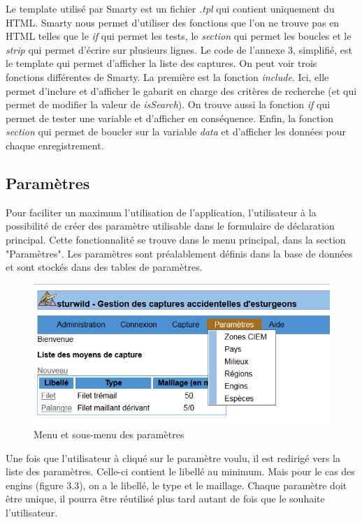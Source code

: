 \documentclass[12pt,a4paper,titlepage,twoside]{report}
\begin{document}
Le template utilisé par Smarty est un fichier \textit{.tpl} qui contient uniquement du HTML. Smarty nous permet d'utiliser des fonctions que l'on ne trouve pas en HTML telles que le \textit{if} qui permet les tests, le \textit{section} qui permet les boucles et le \textit{strip} qui permet d'écrire sur plusieurs lignes. 
Le code de l'annexe 3, simplifié, est le template qui permet d'afficher la liste des captures. On peut voir trois fonctions différentes de Smarty. La première est la fonction \textit{include}. Ici, elle permet d'inclure et d'afficher le gabarit en charge des critères de recherche (et qui permet de modifier la valeur de \textit{isSearch}). On trouve aussi la fonction \textit{if} qui permet de tester une variable et d'afficher en conséquence. Enfin, la fonction \textit{section} qui permet de boucler sur la variable \textit{data} et d'afficher les données pour chaque enregistrement.
\clearpage
\subsection{Paramètres}
Pour faciliter un maximum l'utilisation de l'application, l'utilisateur à la possibilité de créer des paramètre utilisable dans le formulaire de déclaration principal. Cette fonctionnalité se trouve dans le menu principal, dans la section "Paramètres".  Les paramètres sont préalablement définis dans la base de données et sont stockés dans des tables de paramètres.

\begin{figure}[h]
\centering
\includegraphics[scale=0.8]{pictures/menuParam.png}
\caption{Menu et sous-menu des paramètres}
\end{figure}

Une fois que l'utilisateur à cliqué sur le paramètre voulu, il est redirigé vers la liste des paramètres. Celle-ci contient le libellé au minimum. Mais pour le cas des engins (figure 3.3), on a le libellé, le type et le maillage. Chaque paramètre doit être unique, il pourra être réutilisé plus tard autant de fois que le souhaite l'utilisateur.\newline
\end{document}
